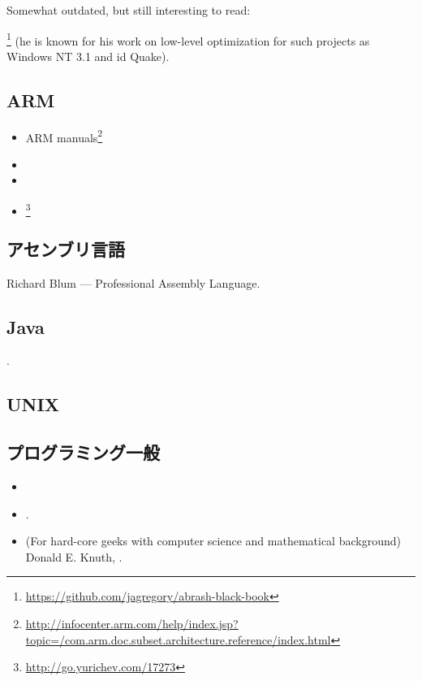 Somewhat outdated, but still interesting to read:

\MAbrash\footnote{\AlsoAvailableAs \url{https://github.com/jagregory/abrash-black-book}}
(he is known for his work on low-level optimization for such projects as Windows NT 3.1 and id Quake).

\subsection{ARM}

\begin{itemize}
\item ARM manuals\footnote{\AlsoAvailableAs \url{http://infocenter.arm.com/help/index.jsp?topic=/com.arm.doc.subset.architecture.reference/index.html}}

\item \ARMSevenRef

\item \ARMSixFourRefURL

\item \ARMCookBook\footnote{\AlsoAvailableAs \url{http://go.yurichev.com/17273}}
\end{itemize}

\subsection{アセンブリ言語}

Richard Blum --- Professional Assembly Language.

\subsection{Java}

\JavaBook.

\subsection{UNIX}

\TAOUP

\subsection{プログラミング一般}

\begin{itemize}

\item \RobPikePractice

\item \HenryWarren.

\item (For hard-core geeks with computer science and mathematical background) Donald E. Knuth, .

\end{itemize}




